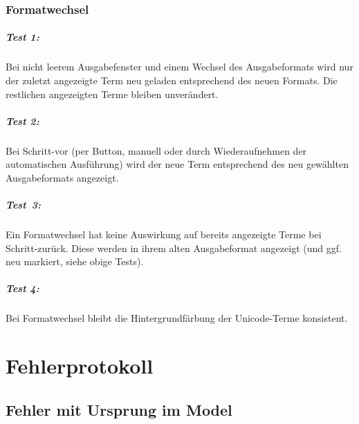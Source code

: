 \documentclass[parskip=full,11pt,openany]{scrreprt}
\begin{document}
\subsection{Formatwechsel}
\paragraph{Test 1:} Bei nicht leerem Ausgabefenster und einem Wechsel des Ausgabeformats wird nur der zuletzt angezeigte Term neu geladen entsprechend des neuen Formats. Die restlichen angezeigten Terme bleiben unverändert.

\paragraph{Test 2:} Bei Schritt-vor (per Button, manuell oder durch Wiederaufnehmen der automatischen Ausführung) wird der neue Term entsprechend des neu gewählten Ausgabeformats angezeigt. 

\paragraph{Test\, 3:} Ein Formatwechsel hat keine Auswirkung auf bereits angezeigte Terme bei Schritt-zurück. Diese werden in ihrem alten Ausgabeformat angezeigt (und ggf. neu markiert, siehe obige Tests).

\paragraph{Test 4:} Bei Formatwechsel bleibt die Hintergrundfärbung der Unicode-Terme konsistent.


\chapter{Fehlerprotokoll}

\newcommand{\issue}[3]{%
	\item[]
	\begin{itemize}[noitemsep]
		\item[]\textbf{#1}
		\item[\textbf{Grund:}]#2
		\item[\textbf{Behebung:}]#3
\end{itemize}}

\section{Fehler mit Ursprung im Model}
\end{document}
